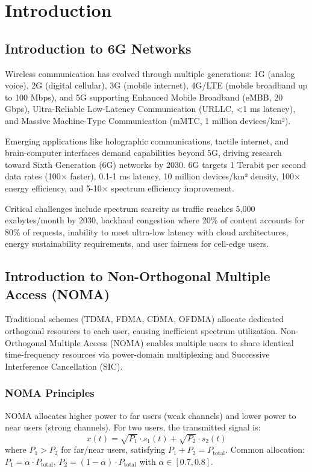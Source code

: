 \documentclass[12pt,a4paper]{article}
\begin{document}
\clearpage

\section{Introduction}

\subsection{Introduction to 6G Networks}

Wireless communication has evolved through multiple generations: 1G (analog voice), 2G (digital cellular), 3G (mobile internet), 4G/LTE (mobile broadband up to 100 Mbps), and 5G supporting Enhanced Mobile Broadband (eMBB, 20 Gbps), Ultra-Reliable Low-Latency Communication (URLLC, <1 ms latency), and Massive Machine-Type Communication (mMTC, 1 million devices/km²).

Emerging applications like holographic communications, tactile internet, and brain-computer interfaces demand capabilities beyond 5G, driving research toward Sixth Generation (6G) networks by 2030. 6G targets 1 Terabit per second data rates (100× faster), 0.1-1 ms latency, 10 million devices/km² density, 100× energy efficiency, and 5-10× spectrum efficiency improvement.

Critical challenges include spectrum scarcity as traffic reaches 5,000 exabytes/month by 2030, backhaul congestion where 20\% of content accounts for 80\% of requests, inability to meet ultra-low latency with cloud architectures, energy sustainability requirements, and user fairness for cell-edge users.

\subsection{Introduction to Non-Orthogonal Multiple Access (NOMA)}

Traditional schemes (TDMA, FDMA, CDMA, OFDMA) allocate dedicated orthogonal resources to each user, causing inefficient spectrum utilization. Non-Orthogonal Multiple Access (NOMA) enables multiple users to share identical time-frequency resources via power-domain multiplexing and Successive Interference Cancellation (SIC).

\subsubsection{NOMA Principles}

NOMA allocates higher power to far users (weak channels) and lower power to near users (strong channels). For two users, the transmitted signal is:
\[
x(t) = \sqrt{P_1} \cdot s_1(t) + \sqrt{P_2} \cdot s_2(t)
\]
where $P_1 > P_2$ for far/near users, satisfying $P_1 + P_2 = P_{\text{total}}$. Common allocation: $P_1 = \alpha \cdot P_{\text{total}}$, $P_2 = (1-\alpha) \cdot P_{\text{total}}$ with $\alpha \in [0.7, 0.8]$.
\end{document}
